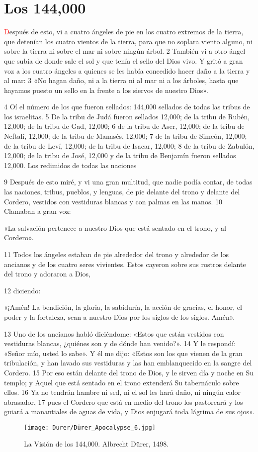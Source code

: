\documentclass[12pt,twocolumn,twoside]{book}
\begin{document}
\chapter{Los 144,000}
\lettrine[lines=4]{\textcolor{red}{D}}{}espués de esto, vi a cuatro ángeles de pie en los cuatro extremos de la tierra, que detenían los cuatro vientos de la tierra, para que no soplara viento alguno, ni sobre la tierra ni sobre el mar ni sobre ningún árbol. 2 También vi a otro ángel que subía de donde sale el sol y que tenía el sello del Dios vivo. Y gritó a gran voz a los cuatro ángeles a quienes se les había concedido hacer daño a la tierra y al mar: 3 «No hagan daño, ni a la tierra ni al mar ni a los árboles, hasta que hayamos puesto un sello en la frente a los siervos de nuestro Dios».

4 Oí el número de los que fueron sellados: 144,000 sellados de todas las tribus de los israelitas. 5 De la tribu de Judá fueron sellados 12,000; de la tribu de Rubén, 12,000; de la tribu de Gad, 12,000; 6 de la tribu de Aser, 12,000; de la tribu de Neftalí, 12,000; de la tribu de Manasés, 12,000; 7 de la tribu de Simeón, 12,000; de la tribu de Leví, 12,000; de la tribu de Isacar, 12,000; 8 de la tribu de Zabulón, 12,000; de la tribu de José, 12,000 y de la tribu de Benjamín fueron sellados 12,000.
Los redimidos de todas las naciones

9 Después de esto miré, y vi una gran multitud, que nadie podía contar, de todas las naciones, tribus, pueblos, y lenguas, de pie delante del trono y delante del Cordero, vestidos con vestiduras blancas y con palmas en las manos. 10 Clamaban a gran voz:

«La salvación pertenece a nuestro Dios que está sentado en el trono, y al Cordero».

11 Todos los ángeles estaban de pie alrededor del trono y alrededor de los ancianos y de los cuatro seres vivientes. Estos cayeron sobre sus rostros delante del trono y adoraron a Dios,

12 diciendo:

«¡Amén! La bendición, la gloria, la sabiduría, la acción de gracias, el honor, el poder y la fortaleza, sean a nuestro Dios por los siglos de los siglos. Amén».

13 Uno de los ancianos habló diciéndome: «Estos que están vestidos con vestiduras blancas, ¿quiénes son y de dónde han venido?». 14 Y le respondí: «Señor mío, usted lo sabe». Y él me dijo: «Estos son los que vienen de la gran tribulación, y han lavado sus vestiduras y las han emblanquecido en la sangre del Cordero. 15 Por eso están delante del trono de Dios, y le sirven día y noche en Su templo; y Aquel que está sentado en el trono extenderá Su tabernáculo sobre ellos. 16 Ya no tendrán hambre ni sed, ni el sol les hará daño, ni ningún calor abrasador, 17 pues el Cordero que está en medio del trono los pastoreará y los guiará a manantiales de aguas de vida, y Dios enjugará toda lágrima de sus ojos».
\begin{figure*}[p!]
	\centering
       \texttt{[image: Durer/Dürer\_Apocalypse\_6.jpg]}    
    	\caption{La Visión de los 144,000. Albrecht Dürer, 1498.}
\end{figure*}
\end{document}

